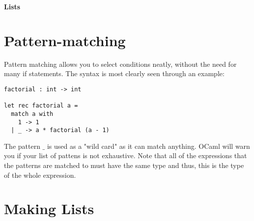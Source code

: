 \documentclass[12pt]{article}
\begin{document}
\begin{center}\LARGE\bf
    Lists
\end{center}

\section{Pattern-matching}
Pattern matching allows you to select conditions neatly, without the need for many if statements. The
syntax is most clearly seen through an example:
\begin{lstlisting}
factorial : int -> int

let rec factorial a =
  match a with
    1 -> 1
  | _ -> a * factorial (a - 1)
\end{lstlisting}
The pattern $\_$ is used as a "wild card" as it can match anything. OCaml will warn you if your list of pattens is not
exhaustive. Note that all of the expressions that the patterns are matched to must have the same type and
thus, this is the type of the whole expression.

\section{Making Lists}
\end{document}
